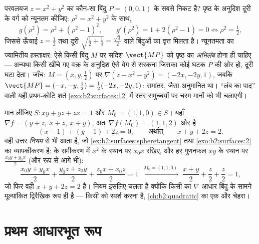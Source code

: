 \begin{example}[पृष्ठ का निकटतम
बिंदु]\label{ex:b2:surfaces:closest}
परवलयज $z = x^2 + y^2$ का कौन-सा बिंदु $P = (0, 0, 1)$ के सबसे निकट है?
पृष्ठ के अनुदिश दूरी के वर्ग को न्यूनतम कीजिए: $\rho^2 = x^2 + y^2$ के साथ,
\[
g(\rho^2) = \rho^2 + (\rho^2 - 1)^2,
\qquad
g'(\rho^2) = 1 + 2(\rho^2 - 1) = 0
\iff \rho^2 = \tfrac12 ,
\]
जिससे ऊँचाई $z = \frac12$ तथा दूरी $\sqrt{\tfrac12 + \tfrac14} = \frac{\sqrt3}2$ वाले
बिंदुओं का वृत्त मिलता है। न्यूनतमता का ज्यामितीय हस्ताक्षर: ऐसे किसी
बिंदु $M$ पर सदिश $\vect{MP}$ को पृष्ठ का \emph{अभिलंब} होना ही
चाहिए --- अन्यथा किसी खींचे गए वक्र के अनुदिश ऐसे वेग से सरकना जिसका
कोई घटक $P$ की ओर हो, दूरी घटा देता। जाँच: $M = (x, y,
\tfrac12)$ पर
$\nabla(z - x^2 - y^2) = (-2x, -2y, 1)$, जबकि $\vect{MP} = (-x, -y, \tfrac12) =
\tfrac12(-2x, -2y, 1)$: समांतर, जैसा अनुमानित था। ``लंब का
पाद'' वाली यही प्रथम-कोटि शर्त \cref{exo:b2:surfaces:12} में स्तर समुच्चयों पर
चरम मानों को भी चलाएगी।
\end{example}

\begin{example}[द्विघातजों के स्पर्श समतल: ध्रुवण
नियम]\label{ex:b2:surfaces:polarization}
मान लीजिए $S : xy + yz + zx = 1$ और $M_0 = (1, 1, 0) \in S$। यहाँ
$\nabla f = (y + z,\ x + z,\ x + y)$, अतः $\nabla f(M_0) = (1,
1, 2)$ और  है
\[
(x - 1) + (y - 1) + 2z = 0,
\qquad\text{अर्थात्}\qquad x + y + 2z = 2 .
\]
वही उत्तर \emph{ नियम} से भी आता है, जो \cref{ex:b2:surfaces:spheretangent} तथा
\cref{exo:b2:surfaces:2} का व्यापकीकरण है:  के समीकरण
में $x^2$ के स्थान पर $x_0x$ रखिए, और हर गुणनफल $xy$ के
स्थान पर $\frac{x_0y +
y_0x}2$ (और  रूप से आगे भी):
\[
\frac{x_0y + y_0x}2 + \frac{y_0z + z_0y}2 + \frac{z_0x +
x_0z}2 = 1
\;\xrightarrow{\ M_0 = (1,1,0)\ }\;
\frac{x + y}2 + \frac z2 + \frac z2 = 1 ,
\]
जो फिर वही $x + y + 2z = 2$ है। नियम इसलिए चलता है क्योंकि किसी 
का $\nabla$ आधार बिंदु के सामने मूल्यांकित  द्विरैखिक रूप ही है
--- किसी  को स्पर्श करना  है, \cref{ch:b2:quadratic} का एक और चेहरा।
\end{example}

\section{प्रथम आधारभूत रूप}

